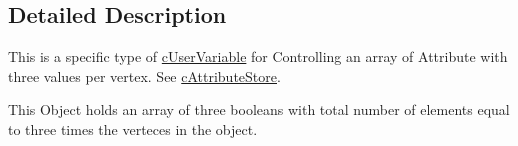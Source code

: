 \subsection{Detailed Description}
This is a specific type of \hyperlink{classc_user_variable}{cUserVariable} for Controlling an array of Attribute with three values per vertex. See \hyperlink{classc_attribute_store}{cAttributeStore}. 

This Object holds an array of three booleans with total number of elements equal to three times the verteces in the object. 